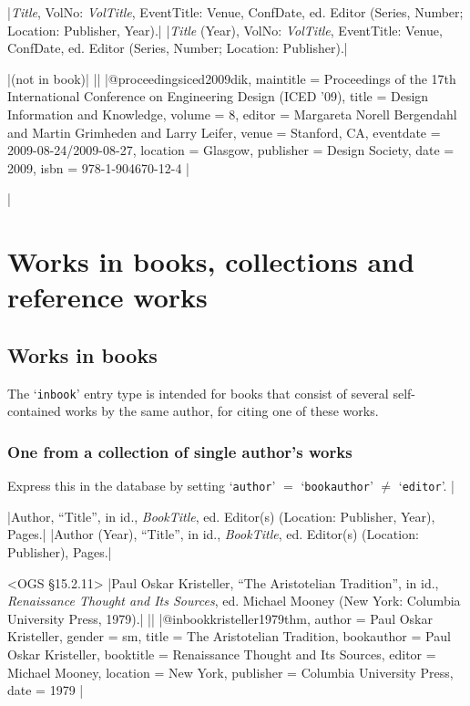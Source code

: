 \documentclass[extrafontsizes,11pt,a4paper,oneside]{memoir}
\newcommand*{\lit}[1]{\textsf{#1}}
\newcommand*{\code}[1]{`\texttt{#1}'}
\begin{document}
\specs
|\emph{Title}, VolNo: \emph{VolTitle}, EventTitle: Venue, ConfDate, \lit{ed.} Editor (Series, Number; Location: Publisher, Year).|%
|\emph{Title} (Year), VolNo: \emph{VolTitle}, EventTitle: Venue, ConfDate, \lit{ed.} Editor (Series, Number; Location: Publisher).|

\bibexample
|(not in book)|%
||%
|@proceedings{iced2009dik,
  maintitle = {Proceedings of the 17th International Conference on Engineering Design (ICED ’09)},
  title = {Design Information and Knowledge},
  volume = {8},
  editor = {Margareta Norell Bergendahl and Martin Grimheden and Larry Leifer},
  venue = {Stanford, CA},
  eventdate = {2009-08-24/2009-08-27},
  location = {Glasgow},
  publisher = {Design Society},
  date = {2009},
  isbn = {978-1-904670-12-4}
}|

\todoc|
\chapter{Works in books, collections and reference works}\label{sec:inx}

\section{Works in books}

The \code{inbook} entry type is intended for books that consist of several self-contained works by the same author, for citing one of these works. 

\subsection{One from a collection of single author's works}

Express this in the database by setting \code{author} $=$ \code{bookauthor} $\neq$ \code{editor}.
|

\specs
|Author, \enquote{Title}, \lit{in id.}, \emph{BookTitle}, \lit{ed.} Editor(s) (Location: Publisher, Year), Pages.|%
|Author (Year), \enquote{Title}, \lit{in id.}, \emph{BookTitle}, \lit{ed.} Editor(s) (Location: Publisher), Pages.|

\bibexample<OGS \S15.2.11>
|Paul Oskar Kristeller, \enquote{The Aristotelian Tradition}, in id., \emph{Renaissance Thought and Its Sources}, ed. Michael Mooney (New York: Columbia University Press, 1979).|%
||%
|@inbook{kristeller1979thm,
  author = {Paul Oskar Kristeller},
  gender = {sm},
  title = {The Aristotelian Tradition},
  bookauthor = {Paul Oskar Kristeller},
  booktitle = {Renaissance Thought and Its Sources},
  editor = {Michael Mooney},
  location = {New York},
  publisher = {Columbia University Press},
  date = {1979}
}|
\end{document}

